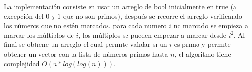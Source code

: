 \documentclass[12pt, a4paper]{article}
\newcommand\cppfile[2][]{

}
\begin{document}
	La implementación consiste en usar un arreglo de bool inicialmente en true (a excepción del $0$ y $1$ que no son 
	primos), después se recorre el arreglo verificando los números que no estén marcados, para cada numero $i$ no 
	marcado se empieza a marcar los múltiplos de $i$, los múltiplos se pueden empezar a marcar desde $i^2$. Al final
	se obtiene un arreglo el cual permite validar si un $i$ es primo y permite obtener un vector con la lista de 
	números primos hasta $n$, el algoritmo tiene complejidad $O(n*log(log(n)))$.
	
	\cppfile[7-21]{Matematicas/codigos/criba.cpp}
	
	
\end{document}
